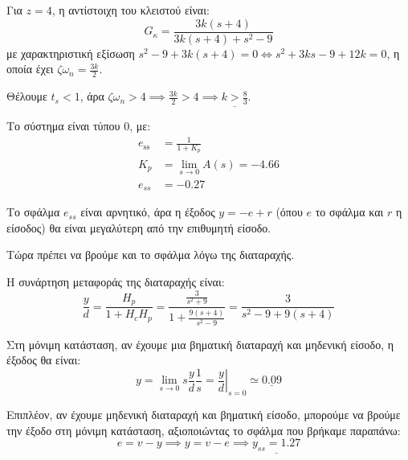 \documentclass[11pt,a4paper,notitlepage,fleqn,final]{article}
\begin{document}
\begin{exercise}
\begin{enumgreekparen}
	
	Για \( z=4 \), η αντίστοιχη του κλειστού είναι:
	\[
	G_κ = \frac{3k(s+4)}{3k(s+4)+s^2-9}
	\]
	με χαρακτηριστική εξίσωση \( s^2-9+3k(s+4) = 0 \iff s^2+3ks -9 + 12k = 0 \), η οποία
	έχει \( ζ\omega_n = \frac{3k}{2} \).
	
	Θέλουμε \( t_s < 1 \), άρα \( ζ\omega_n > 4 \implies \frac{3k}{2}>4 \implies
	\underline{k > \frac{8}{3}} \).
	
	\item
	Το σύστημα είναι τύπου 0, με:
	\begin{align*}
		e_{\mathrm{ss}} &= \frac{1}{1+K_p} \\
		K_p &= \lim_{s\to 0} A(s) = -4.66 \\
		e_{ss} &= -0.27
	\end{align*}
	
	Το σφάλμα \( e_{ss} \) είναι αρνητικό, άρα η έξοδος \( y = -e + r \) (όπου \( e \) το
	σφάλμα και \( r \) η είσοδος) θα είναι μεγαλύτερη από την επιθυμητή είσοδο.
	
	Τώρα πρέπει να βρούμε και το σφάλμα λόγω της διαταραχής.
	
	Η συνάρτηση μεταφοράς της διαταραχής είναι:
	\[
	\frac{y}{d} = \frac{H_p}{1+H_cH_p} = \frac{\frac{3}{s^2+9}}{1+\frac{9(s+4)}{s^2-9}}
	= \frac{3}{s^2-9+9(s+4)}
	\]
	
	Στη μόνιμη κατάσταση, αν έχουμε μια βηματική διαταραχή και μηδενική είσοδο, η έξοδος
	θα είναι:
	\[
	y = \lim_{s\to 0}s\frac{y}{d}\frac{1}{s} = \left.\frac{y}{d}\right|_{s=0}
	\simeq \underline{0.09}
	\]
	
	Επιπλέον, αν έχουμε μηδενική διαταραχή και βηματική είσοδο, μπορούμε να βρούμε την
	έξοδο στη μόνιμη κατάσταση, αξιοποιώντας το σφάλμα που βρήκαμε παραπάνω:
	\[
	e=v-y \implies y=v-e \implies \underline{y_{ss}= 1.27}
	\]
	

\end{enumgreekparen}
\end{exercise}
\end{document}

